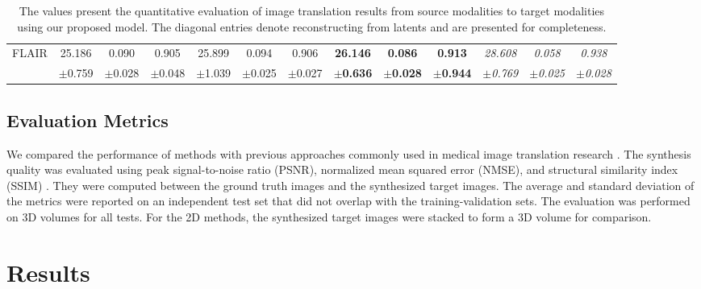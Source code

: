 \documentclass[10pt,twocolumn,letterpaper]{article}
\begin{document}
\begin{table*} [ht]
{\begin{tabular}{ccccccccccccc}
            \multirow{2}{*}{FLAIR} 
            & 25.186 & 0.090 & 0.905 
            & 25.899 & 0.094 & 0.906 
            & \textbf{26.146} & \textbf{0.086} & \textbf{0.913}
            & \textit{28.608} & \textit{0.058} & \textit{0.938} \\
            & \footnotesize{$\pm$0.759} & \footnotesize{$\pm$0.028} & \footnotesize{$\pm$0.048} 
            & \footnotesize{$\pm$1.039} & \footnotesize{$\pm$0.025} & \footnotesize{$\pm$0.027} 
            & \textbf{\footnotesize{$\pm$0.636}} & \textbf{\footnotesize{$\pm$0.028}} & \textbf{\footnotesize{$\pm$0.944}} 
            & \textit{\footnotesize{$\pm$0.769}} & \textit{\footnotesize{$\pm$0.025}} & \textit{\footnotesize{$\pm$0.028}}\\
            
            \bottomrule
        \end{tabular}
    }
    \vspace{-3pt}
    \caption{The values present the quantitative evaluation of image translation results from source modalities to target modalities using our proposed model. The diagonal entries denote reconstructing from latents and are presented for completeness.} 
    \vspace{-8pt}
    \label{table2}
\end{table*}

\subsection{Evaluation Metrics}
We compared the performance of methods with previous approaches commonly used in medical image translation research \cite{yi2019generative}. The synthesis quality was evaluated using peak signal-to-noise ratio (PSNR), normalized mean squared error (NMSE), and structural similarity index (SSIM) \cite{yi2019generative}. They were computed between the ground truth images and the synthesized target images. The average and standard deviation of the metrics were reported on an independent test set that did not overlap with the training-validation sets. The evaluation was performed on 3D volumes for all tests. For the 2D methods, the synthesized target images were stacked to form a 3D volume for comparison.




\section{Results}
\end{document}
